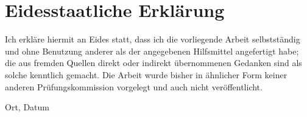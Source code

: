 \chapter{Eidesstaatliche Erklärung}
Ich erkl\"are hiermit an Eides statt, dass ich die vorliegende Arbeit selbstst\"andig und ohne Benutzung anderer als der angegebenen Hilfsmittel angefertigt habe; die aus fremden Quellen direkt oder indirekt \"ubernommenen Gedanken sind als solche kenntlich gemacht. Die Arbeit wurde bisher in \"ahnlicher Form keiner anderen Pr\"ufungskommission vorgelegt und auch nicht ver\"offentlicht.

\bigskip
\bigskip
\bigskip
\bigskip
	
   \begin{multicols}{2}
      \raggedright
      Ort, Datum
        
      \raggedleft
      \authorname
      
   \end{multicols}
